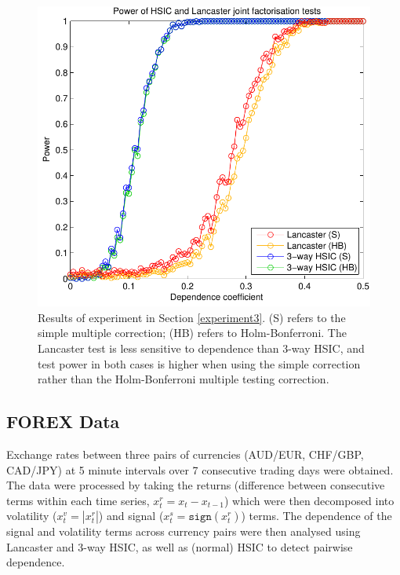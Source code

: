 \documentclass[]{article}
\begin{document}
\begin{figure}[ht]
\vskip 0.2in
\begin{center}
\centerline{\includegraphics[scale=0.6]{UAI_Figure3.pdf}}
\caption{Results of experiment in Section \ref{experiment3}. (S) refers to the simple multiple correction; (HB) refers to Holm-Bonferroni. The Lancaster test is less sensitive to dependence than 3-way HSIC, and test power in both cases is higher when using the simple correction rather than the Holm-Bonferroni multiple testing correction.}
\label{strong-pairwise}
\end{center}
\vskip -0.2in
\end{figure} 

\subsection{FOREX Data}

Exchange rates between three pairs of currencies (AUD/EUR, CHF/GBP, CAD/JPY) at 5 minute intervals over 7 consecutive trading days were obtained. The data were processed by taking the returns (difference between consecutive terms within each time series, $x_t^r = x_t-x_{t-1}$) which were then decomposed into volatility ($x_t^v=|x_t^r|$) and signal ($x_t^s = \mathtt{sign}(x_t^r)$) terms. The dependence of the signal and volatility terms across currency pairs were then analysed using Lancaster and 3-way HSIC, as well as (normal) HSIC to detect pairwise dependence. 
\end{document}
